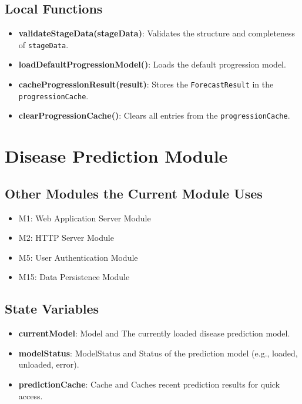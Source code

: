 \documentclass[12pt, titlepage]{article}
\begin{document}
\subsection{Local Functions}
\begin{itemize}
    \item \textbf{validateStageData(stageData)}: Validates the structure and completeness of \texttt{stageData}.
    \item \textbf{loadDefaultProgressionModel()}: Loads the default progression model.
    \item \textbf{cacheProgressionResult(result)}: Stores the \texttt{ForecastResult} in the \texttt{progressionCache}.
    \item \textbf{clearProgressionCache()}: Clears all entries from the \texttt{progressionCache}.
\end{itemize}

\section{Disease Prediction Module}
\label{Disease Prediction Module}

\subsection{Other Modules the Current Module Uses}
\begin{itemize}
    \item M1: Web Application Server Module
    \item M2: HTTP Server Module
    \item M5: User Authentication Module
    \item M15: Data Persistence Module
\end{itemize}

\subsection{State Variables}
\begin{itemize}
    \item \textbf{currentModel}: Model and The currently loaded disease prediction model.
    \item \textbf{modelStatus}: ModelStatus and Status of the prediction model (e.g., loaded, unloaded, error).
    \item \textbf{predictionCache}: Cache and Caches recent prediction results for quick access.
\end{itemize}
\end{document}
